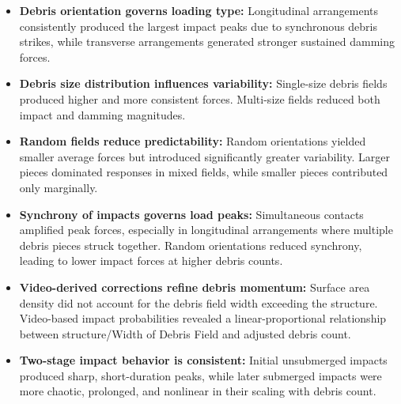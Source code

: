 \documentclass{article}
\begin{document}
\begin{itemize}
    \item \textbf{Debris orientation governs loading type:} Longitudinal arrangements consistently produced the largest impact peaks due to synchronous debris strikes, while transverse arrangements generated stronger sustained damming forces.
    
    \item \textbf{Debris size distribution influences variability:} Single-size debris fields produced higher and more consistent forces. Multi-size fields reduced both impact and damming magnitudes.
    
    \item \textbf{Random fields reduce predictability:} Random orientations yielded smaller average forces but introduced significantly greater variability. Larger pieces dominated responses in mixed fields, while smaller pieces contributed only marginally.
   
    \item \textbf{Synchrony of impacts governs load peaks:} Simultaneous contacts amplified peak forces, especially in longitudinal arrangements where multiple debris pieces struck together. Random orientations reduced synchrony, leading to lower impact forces at higher debris counts.
    
    \item \textbf{Video-derived corrections refine debris momentum:} Surface area density did not account for the debris field width exceeding the structure. Video-based impact probabilities revealed a linear-proportional relationship between structure/Width of Debris Field and adjusted debris count. 


    \item \textbf{Two-stage impact behavior is consistent:} Initial unsubmerged impacts produced sharp, short-duration peaks, while later submerged impacts were more chaotic, prolonged, and nonlinear in their scaling with debris count.
\end{itemize}
\end{document}
